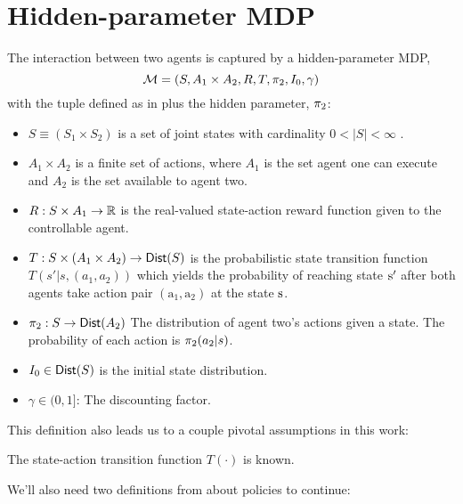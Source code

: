 \section{Hidden-parameter MDP}\label{sec:hipmdp}
    \begin{definition}\label{def:hipmdp}
        The interaction between two agents is captured by a hidden-parameter \ac{MDP},
        \[
            \mathcal{M} = (S, A_1 \times A_2, R, T, \pi_{2}, I_0 , \gamma)
        \]
        with the tuple defined as in \cite{Sugiyama2015StatisticalRL} plus the hidden parameter, $\pi_{2}$:
        \begin{itemize}
            \item $S \equiv (S_1 \times S_2)$ is a set of joint states with cardinality $0 < |S| < \infty$ .
            \item $A_1\times A_2$ is a finite set of actions, where $A_1$ is the set agent one can execute and $A_2$ is
                the set available to agent two.
            \item $R: S\times A_1 \rightarrow \mathbb{R}$ is the real-valued state-action reward function given to the
                controllable agent.
            \item $T: S\times (A_1\times A_2)\rightarrow \mathsf{Dist}(S)$ is the probabilistic state transition function
                $ T(s'| s, (a_1,a_2)) $ which yields the probability of reaching state $\textnormal{s}'$ after both
                agents take action pair $(\text{a}_1,\text{a}_2)$ at the state $\textnormal{s}$.
            \item $\pi_{2} : S \rightarrow \mathsf{Dist}(A_2)$ The distribution of agent two's actions given a
                state. The probability of each action is $\pi_{2}(a_2|s)$.
            \item $I_0 \in \mathsf{Dist}(S)$ is the initial state distribution.
            \item $\gamma \in (0,1]$: The discounting factor.
        \end{itemize}
    \end{definition}

    \noindent
    This definition also leads us to a couple pivotal assumptions in this work:

    \begin{assumption}
        The state-action transition function $T(\cdot)$ is known.
    \end{assumption}

    We'll also need two definitions from \cite{Guo2009} about policies to continue:


